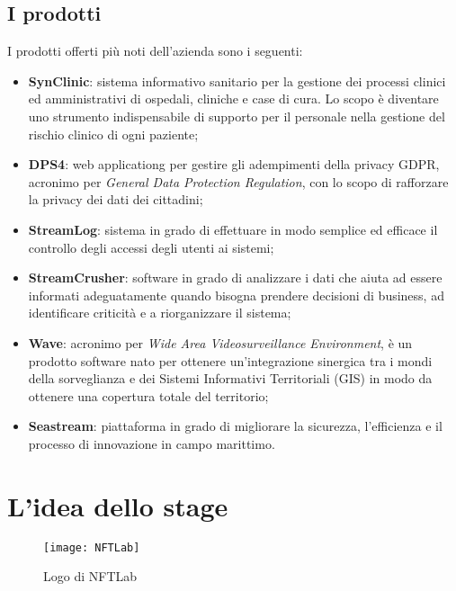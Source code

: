 \subsection{I prodotti}
\label{subsec:prodotti}

I prodotti offerti più noti dell'azienda sono i seguenti:
\begin{itemize}
	\item \textbf{SynClinic}: sistema informativo sanitario per la gestione dei processi clinici ed amministrativi di ospedali, cliniche e case di cura. Lo scopo è diventare uno strumento indispensabile di supporto per il personale nella gestione del rischio clinico di ogni paziente;
	\item \textbf{DPS4}: \gls{web applicationg} per gestire gli adempimenti della privacy GDPR, acronimo per \textit{General Data Protection Regulation}, con lo scopo di rafforzare la privacy dei dati dei cittadini;
	\item \textbf{StreamLog}: sistema in grado di effettuare in modo semplice ed efficace il controllo degli accessi degli utenti ai sistemi;
	\item \textbf{StreamCrusher}: software in grado di analizzare i dati che aiuta ad essere informati adeguatamente quando bisogna prendere decisioni di business, ad identificare criticità e a riorganizzare il sistema;
	\item \textbf{Wave}: acronimo per \textit{Wide Area Videosurveillance Environment}, è un prodotto software nato per ottenere un'integrazione sinergica tra i mondi della sorveglianza e dei Sistemi Informativi Territoriali (GIS) in modo da ottenere una copertura totale del territorio;
	\item \textbf{Seastream}: piattaforma in grado di migliorare la sicurezza, l'efficienza e il processo di innovazione in campo marittimo.
\end{itemize}

\section{L'idea dello stage}
\label{subsec:idea-stage}

\begin{figure}[H]
	\begin{center}
		\texttt{[image: NFTLab]}
		\caption{Logo di NFTLab}
	\end{center}
\end{figure}

